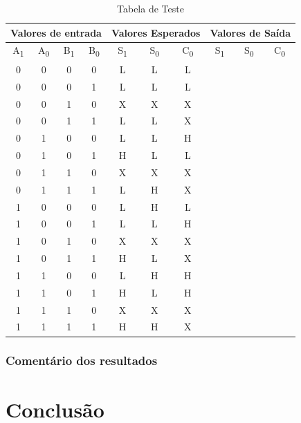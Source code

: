 \documentclass[a4paper,12pt]{article}
\begin{document}
\begin{table}
\centering
\begin{tabular}{ || c  c | c c || c | c | c || c | c |c || }
\hline 
\multicolumn{4}{||c||}{Valores de entrada} & \multicolumn{3}{c||}{Valores Esperados} & \multicolumn{3}{c||}{Valores de Saída} \\
  \hline
A\textsubscript{1} & A\textsubscript{0} & B\textsubscript{1} & B\textsubscript{0} & S\textsubscript{1} & S\textsubscript{0} & C\textsubscript{0} & S\textsubscript{1} & S\textsubscript{0} & C\textsubscript{0} \\ \hline
0   & 0  & 0  & 0  & L  & L  & L &&& \\ \hline
0   & 0  & 0  & 1  & L  & L  & L &&&\\ \hline
0   & 0  & 1  & 0  & X  & X  & X  &&&\\ \hline
0   &  0  & 1   & 1   & L   & L   & X &&&\\ \hline
0   &  1  &  0  & 0   & L   & L   & H  &&&\\ \hline
0   &  1  &  0  & 1   & H   & L   & L  &&&\\ \hline
0   &  1  &  1  & 0   & X   & X   & X  &&&\\ \hline
0   &  1  &  1  & 1   & L   & H   & X  &&&\\ \hline
1   &  0  &  0  & 0   & L   & H   & L  &&&\\ \hline
1   &  0  &  0  & 1   & L   & L   & H  &&&\\ \hline
1   &  0  &  1  & 0   & X   & X   & X  &&&\\ \hline
1   &  0  &  1  & 1   & H   & L   & X  &&&\\ \hline
1   &  1  &  0  & 0   & L   & H   & H  &&&\\ \hline
1   &  1  &  0  & 1   & H   & L   & H  &&&\\ \hline
1   &  1  &  1  & 0   & X   & X   & X  &&&\\ \hline
1   &  1  &  1  & 1   & H   & H   & X  &&&\\ \hline
\end{tabular} 
\caption{Tabela de Teste}
\end{table}
\subsubsection{Comentário dos resultados}
\vspace*{16\baselineskip}
\section{Conclusão}
\par
\end{document}
